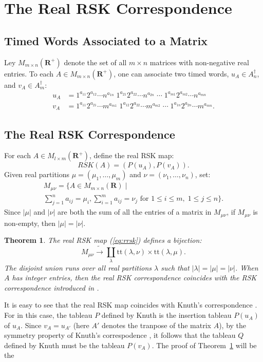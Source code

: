 \documentclass[12pt]{amsart}
\newtheorem{theorem}{Theorem}[subsection]
\theoremstyle{definition}
\newcommand{\ttab}{\mathrm{tt}}
\newcommand{\RR}{\mathbf R}
\begin{document}
\section{The Real RSK Correspondence}
\label{sec:real-rsk-corr}
\subsection{Timed Words Associated to a Matrix}
\label{sec:timed-wds-matrix}
Ley $M_{m\times n}(\RR^+)$ denote the set of all $m\times n$ matrices with non-negative real entries.
To each $A\in M_{m\times n}(\RR^+)$, one can associate two timed words, $u_A\in A_n^\dagger$, and $v_A\in A_m^\dagger$:
\begin{align*}
  u_A & = 1^{a_{11}} 2^{a_{12}}\dotsb n^{a_{1n}}\;1^{a_{21}} 2^{a_{22}}\dotsb n^{a_{2n}}\;\dotsb \;1^{a_{m1}} 2^{a_{m2}}\dotsb n^{a_{mn}}\\
  v_A & = 1^{a_{11}} 2^{a_{21}}\dotsb m^{a_{m1}}\;1^{a_{12}} 2^{a_{22}}\dotsb m^{a_{m2}}\;\dotsb \;1^{a_{1n}} 2^{a_{2n}}\dotsb m^{a_{mn}}.
\end{align*}
\subsection{The Real RSK Correspondence}
\label{sec:real-rsk-corr-subsec}
For each $A\in M_{l\times m}(\RR^+)$, define the real RSK map:
\begin{equation}
  \label{eq:rrsk}
  RSK(A) = (P(u_A), P(v_A)).
\end{equation}
Given real partitions $\mu=(\mu_1,\dotsc,\mu_m)$ and $\nu=(\nu_1,\dotsc,\nu_n)$, set:
\begin{multline*}
  M_{\mu\nu} = \{A\in M_{m\times n}(\RR)\mid \\
  \sum_{j=1}^n a_{ij} = \mu_i, \sum_{i=1}^m a_{ij}=\nu_j \text{ for }1\leq i \leq m,\; 1\leq j\leq n\}.
\end{multline*}
Since $|\mu|$ and $|\nu|$ are both the sum of all the entries of a matrix in $M_{\mu\nu}$, if $M_{\mu\nu}$ is non-empty, then $|\mu|=|\nu|$.
\begin{theorem}
  \label{theorem:real-rsk}
  The real RSK map (\ref{eq:rrsk}) defines a bijection:
  \begin{displaymath}
    M_{\mu\nu} \tilde{\to} \coprod_\lambda \ttab(\lambda,\nu)\times \ttab(\lambda,\mu).
  \end{displaymath}
  The disjoint union runs over all real partitions $\lambda$ such that $|\lambda|=|\mu|=|\nu|$.
  When $A$ has integer entries, then the real RSK correspondence coincides with the RSK correspondence introduced in \cite[Section~3]{knuth}.
\end{theorem}
It is easy to see that the real RSK map coincides with Knuth's correspondence \cite[Section~3]{knuth}.
For in this case, the tableau $P$ defined by Knuth is the insertion tableau $P(u_A)$ of $u_A$.
Since $v_A = u_{A'}$ (here $A'$ denotes the tranpose of the matrix $A$), by the symmetry property of Knuth's correspodence \cite[Theorem~3]{knuth}, it follows that the tableau $Q$ defined by Knuth must be the tableau $P(v_A)$.
The proof of Theorem~\ref{theorem:real-rsk} will be the 
\end{document}
